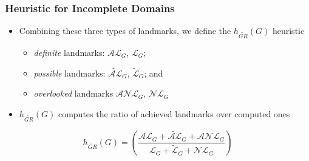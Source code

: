 \documentclass{beamer}
\begin{document}
\begin{frame}[c]\frametitle{Heuristic for Incomplete Domains}
	\begin{itemize}
		\item Combining these three types of landmarks, we define the $h_{\widetilde{GR}}(G)$ heuristic
		\begin{itemize}
			\item \textit{definite}  landmarks: $\mathcal{AL}_{G}$, $\mathcal{L}_{G}$;
			\item \textit{possible}  landmarks: $\mathcal{\widetilde{AL}}_{G}$, $\mathcal{\widetilde{L}}_{G}$; and
			\item \textit{overlooked} landmarks $\mathcal{ANL}_{G}$, $\mathcal{NL}_{G}$
		\end{itemize}
		\item $h_{\widetilde{GR}}(G)$ computes the ratio of achieved landmarks over computed ones
	\end{itemize}
$$h_{\widetilde{GR}}(G) = \left(\frac{\mathcal{AL}_{G} + \mathcal{\widetilde{AL}}_{G} + \mathcal{ANL}_{G}}{\mathcal{L}_{G} + \mathcal{\widetilde{L}}_{G} + \mathcal{NL}_{G}}\right)$$	
\end{frame}
\end{document}
